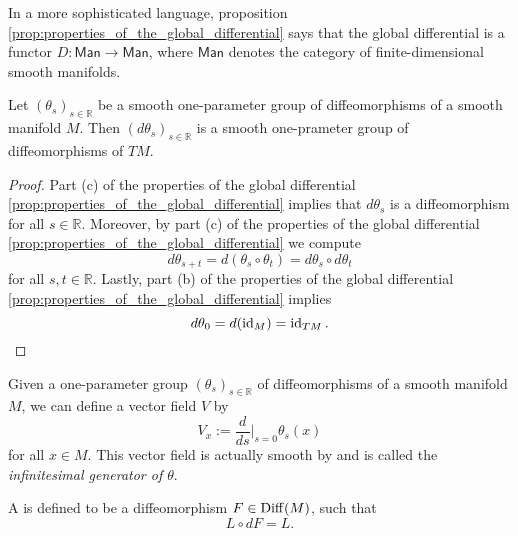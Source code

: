 \begin{remark}
	In a more sophisticated language, proposition \ref{prop:properties_of_the_global_differential} says that the global differential is a functor $D : \mathsf{Man} \to \mathsf{Man}$, where $\mathsf{Man}$ denotes the category of finite-dimensional smooth manifolds.
\end{remark}

\begin{lemma}
	\label{lem:induced_one-parameter_group_of_diffeomorphisms}
	Let $(\theta_s)_{s \in \mathbb{R}}$ be a smooth one-parameter group of diffeomorphisms of a smooth manifold $M$. Then $(d\theta_s)_{s \in \mathbb{R}}$ is a smooth one-prameter group of diffeomorphisms of $TM$.
\end{lemma}

\begin{proof}
	Part (c) of the properties of the global differential \ref{prop:properties_of_the_global_differential} implies that $d\theta_s$ is a diffeomorphism for all $s \in \mathbb{R}$. Moreover, by part (c) of the properties of the global differential \ref{prop:properties_of_the_global_differential} we compute
	\begin{equation*}
		d\theta_{s + t} = d(\theta_s \circ \theta_t) = d\theta_s \circ d\theta_t
	\end{equation*}
	\noindent for all $s,t \in \mathbb{R}$. Lastly, part (b) of the properties of the global differential \ref{prop:properties_of_the_global_differential} implies
	\begin{equation*}
		d\theta_0 = d(\operatorname{id}_M) = \operatorname{id}_{TM}.
	\end{equation*}
\end{proof}

Given a one-parameter group $(\theta_s)_{s \in \mathbb{R}}$ of diffeomorphisms of a smooth manifold $M$, we can define a vector field $V$ by
\begin{equation*}
	V_x := \frac{d}{ds}\bigg\vert_{s = 0} \theta_s(x)
\end{equation*}
\noindent for all $x \in M$. This vector field is actually smooth by \cite[210]{lee:smooth_manifolds:2013} and is called the \emph{infinitesimal generator of $\theta$}.

\begin{definition}[Symmetry]
	A  is defined to be a diffeomorphism $F \in \operatorname{Diff}(M)$, such that
	\begin{equation*}
		L \circ dF = L.
	\end{equation*}
\end{definition}

